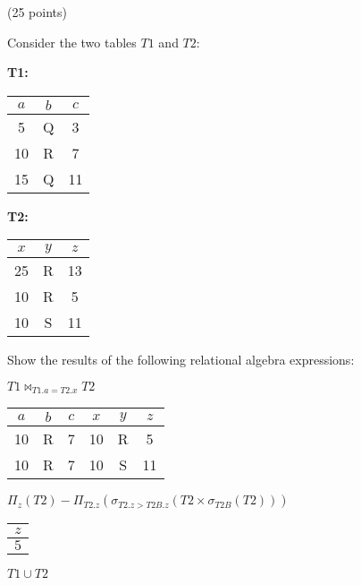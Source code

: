 \begin{problem} (25 points)

  \noindent
  Consider the two tables $T1$ and $T2$:

  \begin{multicols}{2}
    \textbf{T1:}
    
    \centering
    \begin{tabular}{ c c c }
      \midrule
      $a$ & $b$ & $c$ \\
      \midrule
      5 & Q & 3 \\
      \midrule
      10 & R & 7 \\
      \midrule
      15 & Q & 11 \\
      \bottomrule
    \end{tabular}

    \flushleft
    \textbf{T2:}

    \centering
    \begin{tabular}{ c c c }
      \midrule
      $x$ & $y$ & $z$ \\
      \midrule
      25 & R & 13 \\
      \midrule
      10 & R & 5 \\
      \midrule
      10 & S & 11 \\
      \bottomrule
    \end{tabular}
  \end{multicols}

  \noindent
  Show the results of the following relational algebra expressions:

  \begin{enumalph}
    \item $T1 \Join_{T1.a = T2.x} T2$
    
    \begin{Answer}
      \centering
      \begin{tabular}{c c c c c c }
        \midrule
        $a$ & $b$ & $c$ & $x$ & $y$ & $z$ \\
        \midrule
        10 & R & 7 & 10 & R & 5 \\
        \midrule
        10 & R & 7 & 10 & S & 11 \\
        \midrule
      \end{tabular}
    \end{Answer}

    \item $\Pi_{z}(T2) - \Pi_{T2.z}(\sigma_{T2.z > T2B.z}(T2 \times \sigma_{T2B}(T2)))$
    
    \begin{Answer}
      \centering
      \begin{tabular}{ c }
        \midrule
        $z$ \\
        \midrule
        $5$ \\
        \midrule
      \end{tabular}
    \end{Answer}
    \item $T1 \cup T2$
    

\end{enumalph}
\end{problem}
